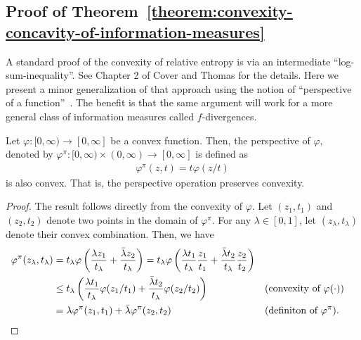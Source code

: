 \documentclass[12pt]{article}
\begin{document}
\subsection{Proof of Theorem~\ref{theorem:convexity-concavity-of-information-measures}}
\label{proof:convexity-concavity-of-information-measures}

A standard proof of the convexity of relative entropy is via an intermediate ``log-sum-inequality''. See Chapter 2 of Cover and Thomas for the details. Here we present a minor generalization of that approach using the notion of ``perspective of a function''~\citep[Sec. 3.2.6]{boyd2004convex}. The benefit is that the same argument will work for a more general class of information measures called $f$-divergences. 

\begin{lemma}
	\label{lemma:perspective-transform} Let $\varphi:[0, \infty) \to [0, \infty]$ be a convex function. Then, the perspective of $\varphi$, denoted by $\varphi^\pi:[0, \infty) \times (0, \infty) \to [0, \infty]$ is defined as 
	\begin{align}
		\varphi^\pi(z, t) = t \varphi(z/t)
	\end{align}
	is also convex. That is, the perspective operation preserves convexity. 
\end{lemma}
\begin{proof}
	The result follows directly from the convexity of $\varphi$. Let $(z_1, t_1)$ and $(z_2, t_2)$ denote two points in the domain of $\varphi^\pi$. For any $\lambda \in [0,1]$, let $(z_\lambda, t_\lambda)$ denote their convex combination. Then, we have 
	\begin{align}
		\varphi^{\pi}(z_\lambda, t_\lambda) &= t_\lambda \varphi\left( \frac{\lambda z_1}{t_\lambda} + \frac{\bar{\lambda} z_2}{t_\lambda} \right)  
		= t_\lambda \varphi\left( \frac{\lambda t_1 }{t_\lambda} \frac{z_1}{t_1} + \frac{\bar{\lambda} t_2 }{t_\lambda} \frac{z_2}{t_2} \right)  \\
		&\leq t_\lambda\left( \frac{\lambda t_1 }{t_\lambda} \varphi(z_1/t_1) + \frac{\bar{\lambda} t_2 }{t_\lambda} \varphi(z_2/t_2)\right) && (\text{convexity of } \varphi(\cdot)) \\
		& = \lambda \varphi^\pi(z_1, t_1) + \bar{\lambda} \varphi^{\pi}(z_2, t_2) && (\text{definiton of } \varphi^\pi). 
	\end{align}
\end{proof}
\end{document}
